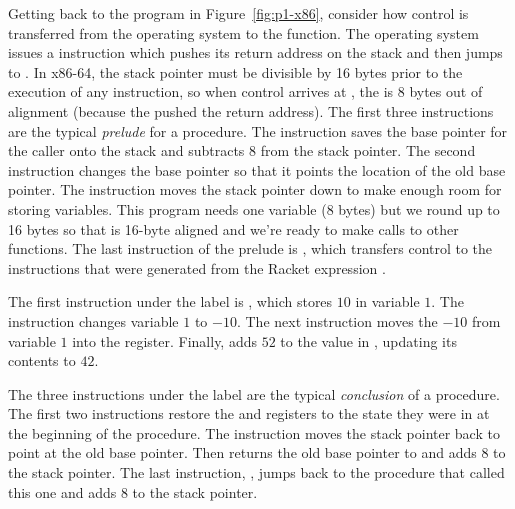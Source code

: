 \documentclass[11pt]{book}
\begin{document}
Getting back to the program in Figure~\ref{fig:p1-x86}, consider how
control is transferred from the operating system to the 
function.  The operating system issues a  instruction
which pushes its return address on the stack and then jumps to
. In x86-64, the stack pointer  must be divisible
by 16 bytes prior to the execution of any  instruction, so
when control arrives at , the  is 8 bytes out of
alignment (because the  pushed the return address).  The
first three instructions are the typical \emph{prelude}
for a procedure.  The instruction  saves the base
pointer for the caller onto the stack and subtracts $8$ from the stack
pointer. The second instruction  changes the
base pointer so that it points the location of the old base
pointer. The instruction  moves the stack
pointer down to make enough room for storing variables.  This program
needs one variable ($8$ bytes) but we round up to 16 bytes so that
 is 16-byte aligned and we're ready to make calls to other
functions. The last instruction of the prelude is ,
which transfers control to the instructions that were generated from
the Racket expression .

The first instruction under the  label is
, which stores $10$ in variable $1$.
%
The instruction  changes variable $1$ to $-10$.
%
The next instruction moves the $-10$ from variable $1$ into the
 register.  Finally,  adds $52$ to
the value in , updating its contents to $42$.

The three instructions under the label  are the
typical \emph{conclusion} of a procedure.  The first
two instructions restore the  and  registers to
the state they were in at the beginning of the procedure.  The
instruction  moves the stack pointer back to
point at the old base pointer. Then  returns the old
base pointer to  and adds $8$ to the stack pointer.  The last
instruction, , jumps back to the procedure that called this
one and adds $8$ to the stack pointer.
\end{document}
